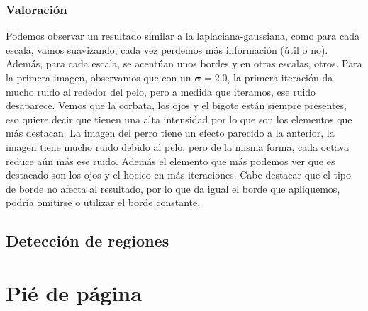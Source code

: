 \documentclass{article}
\begin{document}
\subsubsection{Valoración}
Podemos observar un resultado similar a la laplaciana-gaussiana, como para cada escala, vamos suavizando, cada vez perdemos más información (útil o no). Además, para cada escala, se acentúan unos bordes y en otras escalas, otros.
\newline
\newline
Para la primera imagen, observamos que con un $\boldsymbol{\sigma} = 2.0$, la primera iteración da mucho ruido al rededor del pelo, pero a medida que iteramos, ese ruido desaparece.  Vemos que la corbata, los ojos y el bigote están siempre presentes, eso quiere decir que tienen una alta intensidad por lo que son los elementos que más destacan.
\newline
\newline
La imagen del perro tiene un efecto parecido a la anterior, la imagen tiene mucho ruido debido al pelo, pero de la misma forma, cada octava reduce aún más ese ruido. Además el elemento que más podemos ver que es destacado son los ojos y el hocico en más iteraciones.
\newline
\newline
Cabe destacar que el tipo de borde no afecta al resultado, por lo que da igual el borde que apliquemos, podría omitirse o utilizar el borde constante.

\subsection{Detección de regiones}

\newpage

\section{Pié de página}
\end{document}
